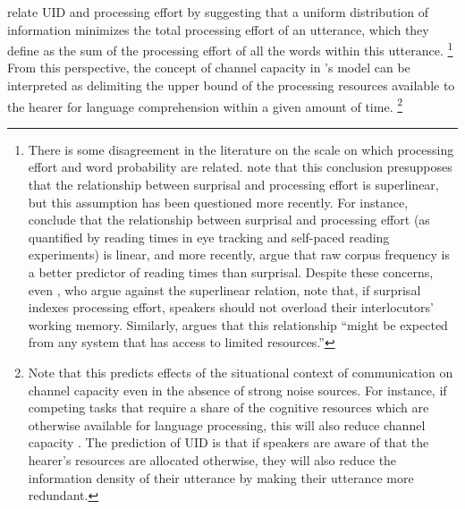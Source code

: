 \citet[850]{levy.jaeger2007} relate UID and processing effort by suggesting that a uniform distribution of information minimizes the total processing effort of an utterance, which they define as the sum of the processing effort of all the words within this utterance.%
%
\footnote{There is some disagreement in the literature on the scale on which processing effort and word probability are related. \citet{levy.jaeger2007} note that this conclusion presupposes that the relationship between surprisal and processing effort is superlinear, but this assumption has been questioned more recently. For instance, \citet{smith.levy2008, smith.levy2013} conclude that the relationship between surprisal and processing effort (as quantified by reading times in eye tracking and self-paced reading experiments) is linear, and more recently, \citet{brothers.kuperberg2019} argue that raw corpus frequency is a better predictor of reading times than surprisal. Despite these concerns, even \citet[311]{smith.levy2013}, who argue against the superlinear relation, note that, if surprisal indexes processing effort, speakers should not overload their interlocutors' working memory. Similarly, \citet[51]{jaeger2010} argues that this relationship ``might be expected from any system that has access to limited resources.''
}\afterfn%
%
From this perspective, the concept of channel capacity in \citeauthor{shannon1948}'s model can be interpreted as delimiting the upper bound of the processing resources available to the hearer for language comprehension within a given amount of time.%
%
\footnote{Note that this predicts effects of the situational context of communication on channel capacity even in the absence of strong noise sources. For instance, if competing tasks that require a share of the cognitive resources which are otherwise available for language processing, this will also reduce channel capacity \citep{engonopoulos.etal2013,hauser.etal2019}. The prediction of UID is that if speakers are aware of that the hearer's resources are allocated otherwise, they will also reduce the information density of their utterance by making their utterance more redundant.}\afterfn%
